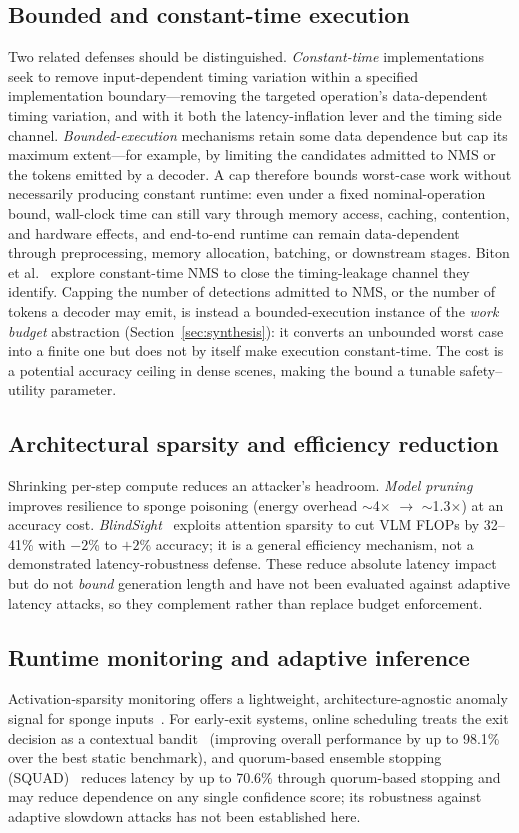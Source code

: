 \documentclass[acmsmall,screen,review,nonacm]{acmart}
\begin{document}
\subsection{Bounded and constant-time execution}
Two related defenses should be distinguished. \emph{Constant-time} implementations seek to remove input-dependent timing variation within a specified implementation boundary---removing the targeted operation's data-dependent timing variation, and with it both the latency-inflation lever and the timing side channel. \emph{Bounded-execution} mechanisms retain some data dependence but cap its maximum extent---for example, by limiting the candidates admitted to NMS or the tokens emitted by a decoder. A cap therefore bounds worst-case work without necessarily producing constant runtime: even under a fixed nominal-operation bound, wall-clock time can still vary through memory access, caching, contention, and hardware effects, and end-to-end runtime can remain data-dependent through preprocessing, memory allocation, batching, or downstream stages. Biton et al.~\cite{biton2023timing} explore constant-time NMS to close the timing-leakage channel they identify. Capping the number of detections admitted to NMS, or the number of tokens a decoder may emit, is instead a bounded-execution instance of the \emph{work budget} abstraction (Section~\ref{sec:synthesis}): it converts an unbounded worst case into a finite one but does not by itself make execution constant-time. The cost is a potential accuracy ceiling in dense scenes, making the bound a tunable safety--utility parameter.

\subsection{Architectural sparsity and efficiency reduction}
Shrinking per-step compute reduces an attacker's headroom. \emph{Model pruning}~\cite{hasan2025sensing} improves resilience to sponge poisoning (energy overhead $\sim$4$\times$ $\to$ $\sim$1.3$\times$) at an accuracy cost. \emph{BlindSight}~\cite{srikrishnan2025blindsight} exploits attention sparsity to cut VLM FLOPs by 32--41\% with $-2$\% to $+2$\% accuracy; it is a general efficiency mechanism, not a demonstrated latency-robustness defense. These reduce absolute latency impact but do not \emph{bound} generation length and have not been evaluated against adaptive latency attacks, so they complement rather than replace budget enforcement.

\subsection{Runtime monitoring and adaptive inference}
Activation-sparsity monitoring offers a lightweight, architecture-agnostic anomaly signal for sponge inputs~\cite{muller2024uniform}. For early-exit systems, online scheduling treats the exit decision as a contextual bandit~\cite{ju2021dee} (improving overall performance by up to 98.1\% over the best static benchmark), and quorum-based ensemble stopping (SQUAD)~\cite{gambella2026squad} reduces latency by up to 70.6\% through quorum-based stopping and may reduce dependence on any single confidence score; its robustness against adaptive slowdown attacks has not been established here.
\end{document}
